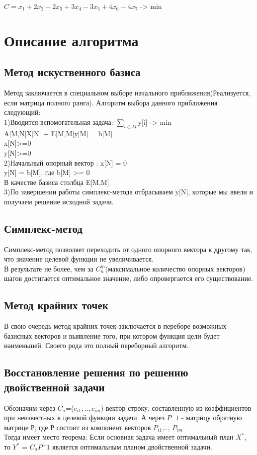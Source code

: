 \documentclass[a4]{article}
\begin{document}
		\begin{center}
			$C = x_1 + 2x_2 - 2x_3 + 3x_4  - 3x_5 + 4x_6 - 4x_7$ -> min
		\end{center}
	\section{Описание алгоритма}
		\subsection{Метод искуственного базиса}
			Метод заключается в специальном выборе начального приближения(Реализуется, если матрица полного ранга). Алгоритм выбора данного приближения следующий:\\
			1)Вводится вспомогательная задача: $\sum_{i \in M}$y[i] -> min\\
			A[M,N]X[N] + E[M,M]y[M] = b[M]\\
			x[N]>=0\\
			y[N]>=0\\
			2)Начальный опорный вектор : x[N] = 0\\
			y[N] = b[M], где b[M] >= 0\\
			В качестве базиса столбца E[M,M]\\
			3)По завершении работы симплекс-метода отбрасываем y[N], которые мы ввели и получаем решение исходной задачи.
		\subsection{Симплекс-метод}
			Симплекс-метод позволяет переходить от одного опорного вектора к другому так, что значение целевой функции не увеличивается.\\
			В результате не более, чем за $C^m_n$(максимальное количество опорных векторов) шагов достигается оптимальное значение, либо опровергается его существование.
			
		\subsection{Метод крайних точек}
			В свою очередь метод крайних точек заключается в переборе возможных базисных векторов и выявление того, при котором функция цели будет наименьшей. Своего рода это полный переборный алгоритм.
		
		\subsection{Восстановление решения по решению двойственной задачи}
			Обозначим через $C_\sigma$=($c_{i1}, .. , c_{im}$) вектор строку, составленную из коэффициентов при неизвестных в целевой функции задачи. А через $P^-1$ - матрицу обратную матрице Р, где Р состоит из компонент векторов $P_{i1}$,.., $P_{im}$\\
			Тогда имеет место теорема: Если основная задача имеет оптимальный план $X^*$, то $Y^*$ = $C_\sigma P^-1$ является оптимальным планом двойственной задачи.
\end{document}
